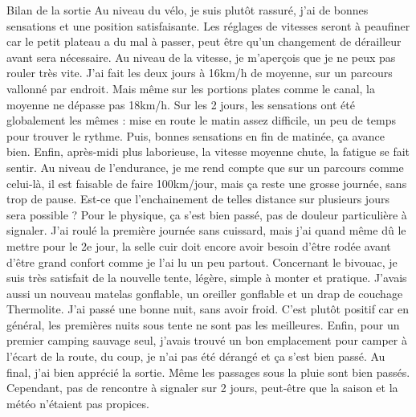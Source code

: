  Bilan de la sortie \newline
 Au niveau du vélo, je suis plutôt rassuré, j'ai de bonnes sensations et une position satisfaisante. Les réglages de vitesses seront à peaufiner car le petit plateau a du mal à passer, peut être qu'un changement de dérailleur avant sera nécessaire. \newline
 Au niveau de la vitesse, je m'aperçois que je ne peux pas rouler très vite. J'ai fait les deux jours à 16km/h de moyenne, sur un parcours vallonné par endroit. Mais même sur les portions plates comme le canal, la moyenne ne dépasse pas 18km/h. Sur les 2 jours, les sensations ont été globalement les mêmes : mise en route le matin assez difficile, un peu de temps pour trouver le rythme. Puis, bonnes sensations en fin de matinée, ça avance bien. Enfin, après-midi plus laborieuse, la vitesse moyenne chute, la fatigue se fait sentir. \newline
 Au niveau de l'endurance, je me rend compte que sur un parcours comme celui-là, il est faisable de faire 100km/jour, mais ça reste une grosse journée, sans trop de pause. Est-ce que l'enchainement de telles distance sur plusieurs jours sera possible ? \newline
 Pour le physique, ça s'est bien passé, pas de douleur particulière à signaler. J'ai roulé la première journée sans cuissard, mais j'ai quand même dû le mettre pour le 2e jour, la selle cuir doit encore avoir besoin d'être rodée avant d'être grand confort comme je l'ai lu un peu partout. \newline
 Concernant le bivouac, je suis très satisfait de la nouvelle tente, légère, simple à monter et pratique. J'avais aussi un nouveau matelas gonflable, un oreiller gonflable et un drap de couchage Thermolite. J'ai passé une bonne nuit, sans avoir froid. C'est plutôt positif car en général, les premières nuits sous tente ne sont pas les meilleures. Enfin, pour un premier camping sauvage seul, j'avais trouvé un bon emplacement pour camper à l'écart de la route, du coup, je n'ai pas été dérangé et ça s'est bien passé. \newline
 Au final, j'ai bien apprécié la sortie. Même les passages sous la pluie sont bien passés. Cependant, pas de rencontre à signaler sur 2 jours, peut-être que la saison et la météo n'étaient pas propices. \newline

\newpage
 
